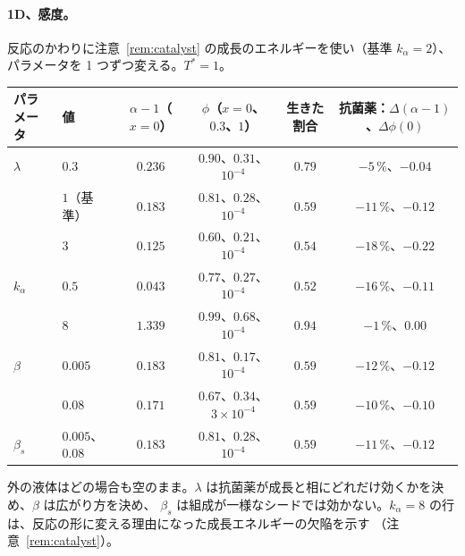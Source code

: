 \documentclass[11pt,a4paper]{article}
\theoremstyle{definition}
\begin{document}
\paragraph{1D、感度。} 反応のかわりに注意~\ref{rem:catalyst} の成長のエネルギーを使い（基準 $k_\alpha=2$）、
パラメータを 1 つずつ変える。$T^*=1$。
\begin{center}\footnotesize
\begin{tabular}{@{}llcccc@{}}
\toprule
パラメータ & 値 & $\alpha-1$（$x=0$） & $\phi$（$x=0$、$0.3$、$1$） & 生きた割合 & 抗菌薬：$\Delta(\alpha-1)$、$\Delta\phi(0)$\\
\midrule
$\lambda$ & $0.3$ & $0.236$ & $0.90$、$0.31$、$10^{-4}$ & $0.79$ & $-5\,\%$、$-0.04$\\
 & $1$（基準） & $0.183$ & $0.81$、$0.28$、$10^{-4}$ & $0.59$ & $-11\,\%$、$-0.12$\\
 & $3$ & $0.125$ & $0.60$、$0.21$、$10^{-4}$ & $0.54$ & $-18\,\%$、$-0.22$\\
$k_\alpha$ & $0.5$ & $0.043$ & $0.77$、$0.27$、$10^{-4}$ & $0.52$ & $-16\,\%$、$-0.11$\\
 & $8$ & $1.339$ & $0.99$、$0.68$、$10^{-4}$ & $0.94$ & $-1\,\%$、$0.00$\\
$\beta$ & $0.005$ & $0.183$ & $0.81$、$0.17$、$10^{-4}$ & $0.59$ & $-12\,\%$、$-0.12$\\
 & $0.08$ & $0.171$ & $0.67$、$0.34$、$3\times10^{-4}$ & $0.59$ & $-10\,\%$、$-0.10$\\
$\beta_s$ & $0.005$、$0.08$ & $0.183$ & $0.81$、$0.28$、$10^{-4}$ & $0.59$ & $-11\,\%$、$-0.12$\\
\bottomrule
\end{tabular}
\end{center}
外の液体はどの場合も空のまま。$\lambda$ は抗菌薬が成長と相にどれだけ効くかを決め、$\beta$ は広がり方を決め、
$\beta_s$ は組成が一様なシードでは効かない。$k_\alpha=8$ の行は、反応の形に変える理由になった成長エネルギーの欠陥を示す
（注意~\ref{rem:catalyst}）。
\end{document}
